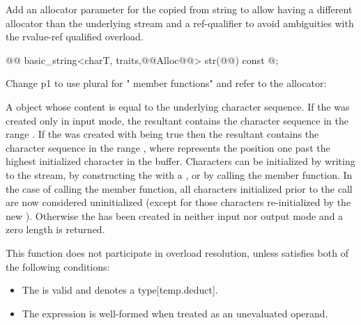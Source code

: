 \documentclass[ebook,11pt,article]{memoir}
\renewcommand{\iref}[1]{[#1]}
\begin{document}
Add an allocator parameter for the copied from string to allow having a different allocator than the underlying stream and a ref-qualifier to avoid ambiguities with the rvalue-ref qualified overload.
\begin{codeblock}
@@
basic_string<charT, traits,@@Alloc@@> str(@@) const @\added{\&};
\end{codeblock}

Change p1 to use plural for " member functions" and refer to the allocator:

\begin{itemdescr}
\pnum
\returns
A
object whose content is equal to the
underlying character sequence.
If the  was created only in input mode, the resultant
 contains the character sequence in the range
. If the  was created with
 being true then the resultant 
contains the character sequence in the range , where
 represents the position one past the highest initialized character
in the buffer. Characters can be initialized by writing to the stream, by constructing
the  with a , or by calling 
the
 member function. In the case of calling 
the
 member function, all characters initialized prior to
the call are now considered uninitialized (except for those characters re-initialized
by the new ). Otherwise the  has been created
in neither input nor output mode and a zero length  is returned. 

\begin{addedblock}
\pnum %
\constraints 
This function does not participate in overload resolution, unless  satisfies both of the following conditions: 

\begin{itemize}
\item The  
is valid and denotes a type\iref{temp.deduct}.

\item The expression 
is well-formed when treated as an unevaluated operand.
\end{itemize}
\end{addedblock}
\end{itemdescr}
\end{document}
